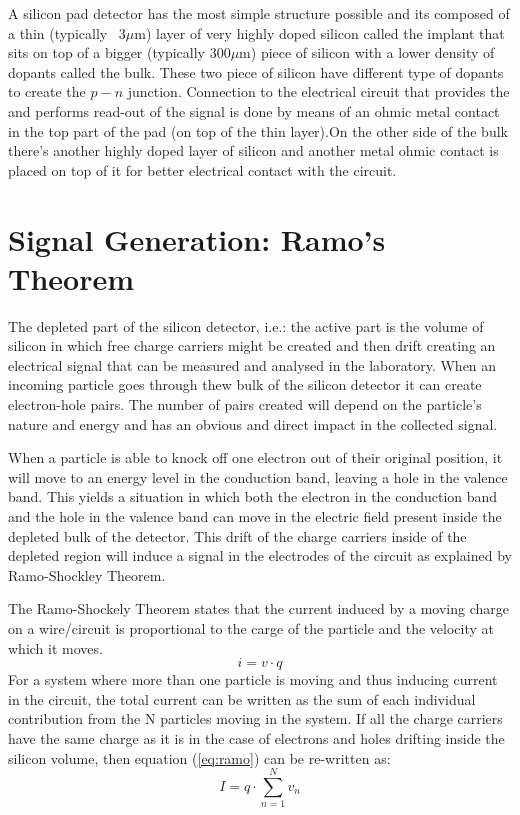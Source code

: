 A silicon pad detector has the most simple structure possible and its composed of a thin (typically ~3$\mu$m) layer of very highly doped silicon called the implant that sits on top of a bigger (typically 300$\mu$m) piece of silicon with a lower density of dopants called the bulk. These two piece of silicon have different type of dopants to create the $p-n$ junction. Connection to the electrical circuit that provides the \vias and performs read-out of the signal is done by means of an ohmic metal contact in the top part of the pad (on top of the thin layer).On the other side of the bulk there's another highly doped layer of silicon and another metal ohmic contact is placed on top of it for better electrical contact with the circuit.

\section{Signal Generation: Ramo's Theorem} %

The depleted part of the silicon detector, i.e.: the active part is the volume of silicon in which free charge carriers might be created and then drift creating an electrical signal that can be measured and analysed in the laboratory. When an incoming particle goes through thew bulk of the silicon detector it can create electron-hole pairs. The number of pairs created will depend on the particle's nature and energy and has an obvious and direct impact in the collected signal. 

When a particle is able to knock off one electron out of their original position, it will move to an energy level in the conduction band, leaving a hole in the valence band. This yields a situation in which both the electron in the conduction band and the hole in the valence band can move in the electric field present inside the depleted bulk of the detector. This drift of the charge carriers inside of the depleted region will induce a signal in the electrodes of the circuit as explained by Ramo-Shockley Theorem.

The Ramo-Shockely Theorem states that the current induced by a moving charge on a wire/circuit is proportional to the carge of the particle and the velocity at which it moves. 
\begin{equation}
	i = v \cdot q
	\label{eq:ramo} 
\end{equation} 
For a system where more than one particle is moving and thus inducing current in the circuit, the total current can be written as the sum of each individual contribution from the N particles moving in the system. If all the charge carriers have the same charge as it is in the case of electrons and holes drifting inside the silicon volume, then equation (\ref{eq:ramo}) can be re-written as:
\begin{equation}
	I = q \cdot \sum_{n=1}^{N} v_n 	\label{eq:ramoTot} 
\end{equation} 

